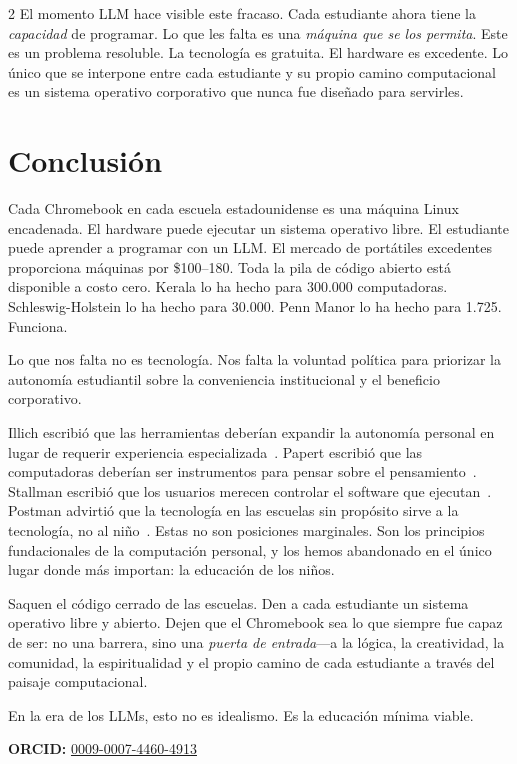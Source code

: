 \documentclass[11pt, a4paper]{article}
\begin{document}
\begin{multicols}{2}
El momento LLM hace visible este fracaso. Cada estudiante ahora tiene la \emph{capacidad} de programar. Lo que les falta es una \emph{máquina que se los permita}. Este es un problema resoluble. La tecnología es gratuita. El hardware es excedente. Lo único que se interpone entre cada estudiante y su propio camino computacional es un sistema operativo corporativo que nunca fue diseñado para servirles.


\section{Conclusión}

Cada Chromebook en cada escuela estadounidense es una máquina Linux encadenada. El hardware puede ejecutar un sistema operativo libre. El estudiante puede aprender a programar con un LLM. El mercado de portátiles excedentes proporciona máquinas por \$100--180. Toda la pila de código abierto está disponible a costo cero. Kerala lo ha hecho para 300.000 computadoras. Schleswig-Holstein lo ha hecho para 30.000. Penn Manor lo ha hecho para 1.725. Funciona.

Lo que nos falta no es tecnología. Nos falta la voluntad política para priorizar la autonomía estudiantil sobre la conveniencia institucional y el beneficio corporativo.

Illich escribió que las herramientas deberían expandir la autonomía personal en lugar de requerir experiencia especializada~\citep{illich1973tools}. Papert escribió que las computadoras deberían ser instrumentos para pensar sobre el pensamiento~\citep{papert1980mindstorms}. Stallman escribió que los usuarios merecen controlar el software que ejecutan~\citep{stallman2002free}. Postman advirtió que la tecnología en las escuelas sin propósito sirve a la tecnología, no al niño~\citep{postman1995end}. Estas no son posiciones marginales. Son los principios fundacionales de la computación personal, y los hemos abandonado en el único lugar donde más importan: la educación de los niños.

Saquen el código cerrado de las escuelas. Den a cada estudiante un sistema operativo libre y abierto. Dejen que el Chromebook sea lo que siempre fue capaz de ser: no una barrera, sino una \emph{puerta de entrada}---a la lógica, la creatividad, la comunidad, la espiritualidad y el propio camino de cada estudiante a través del paisaje computacional.

En la era de los LLMs, esto no es idealismo. Es la educación mínima viable.

\vspace{0.5em}
\noindent\textbf{ORCID:} \href{https://orcid.org/0009-0007-4460-4913}{0009-0007-4460-4913}

\end{multicols}




\end{document}
